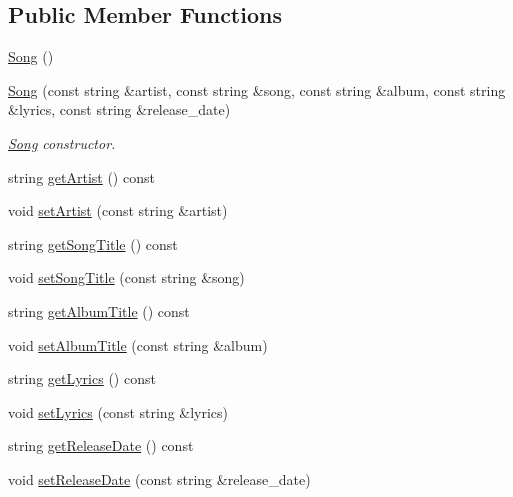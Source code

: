\subsection*{Public Member Functions}
\begin{DoxyCompactItemize}
\item 
\hyperlink{classbridges_1_1dataset_1_1_song_a6b7523787312a5b8d16b20b09ab59ea6}{Song} ()
\item 
\hyperlink{classbridges_1_1dataset_1_1_song_a0938ada0b5596c874aa9254f1bde1275}{Song} (const string \&artist, const string \&song, const string \&album, const string \&lyrics, const string \&release\+\_\+date)
\begin{DoxyCompactList}\small\item\em \hyperlink{classbridges_1_1dataset_1_1_song}{Song} constructor. \end{DoxyCompactList}\item 
string \hyperlink{classbridges_1_1dataset_1_1_song_a1d0ccb86300534ad221a36171e7b2e2b}{get\+Artist} () const
\item 
void \hyperlink{classbridges_1_1dataset_1_1_song_ab37a93674d0e4b219d24c14cfc2b0756}{set\+Artist} (const string \&artist)
\item 
string \hyperlink{classbridges_1_1dataset_1_1_song_a78d4dd02799751849d54b66208cc52a8}{get\+Song\+Title} () const
\item 
void \hyperlink{classbridges_1_1dataset_1_1_song_aa707a5a8905585643893b6c71bf5e299}{set\+Song\+Title} (const string \&song)
\item 
string \hyperlink{classbridges_1_1dataset_1_1_song_a0bc005c3522a1ac6c36bbf721014cb07}{get\+Album\+Title} () const
\item 
void \hyperlink{classbridges_1_1dataset_1_1_song_aab02dcdc8f5332ff18e5127210ba17dc}{set\+Album\+Title} (const string \&album)
\item 
string \hyperlink{classbridges_1_1dataset_1_1_song_a422252665dfb6eff87bef86726c5bc74}{get\+Lyrics} () const
\item 
void \hyperlink{classbridges_1_1dataset_1_1_song_a1ec794f19e791366b9af9df132d4a4b5}{set\+Lyrics} (const string \&lyrics)
\item 
string \hyperlink{classbridges_1_1dataset_1_1_song_aa4ffed01f8c77803e382ba2264fc91ee}{get\+Release\+Date} () const
\item 
void \hyperlink{classbridges_1_1dataset_1_1_song_ab40e43ae94ffc57d2f036769d807a144}{set\+Release\+Date} (const string \&release\+\_\+date)
\end{DoxyCompactItemize}


